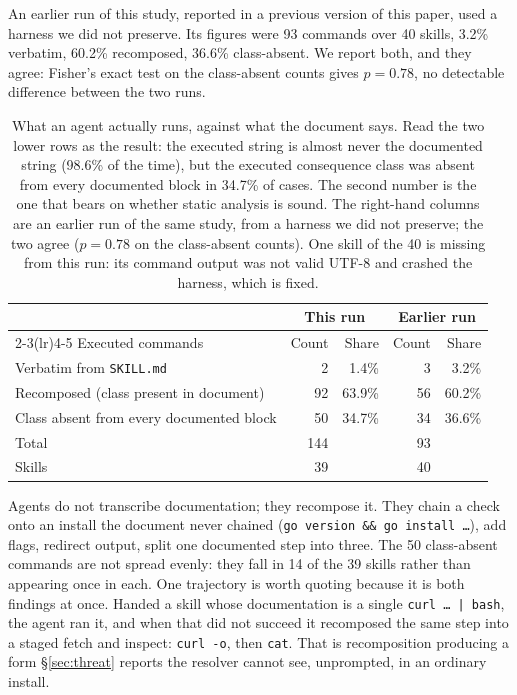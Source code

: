 \documentclass[10pt]{article}
\begin{document}
An earlier run of this study, reported in a previous version of this paper, used a
harness we did not preserve. Its figures were 93 commands over 40 skills, 3.2\%
verbatim, 60.2\% recomposed, 36.6\% class-absent. We report both, and they agree:
Fisher's exact test on the class-absent counts gives $p = 0.78$, no detectable
difference between the two runs.

\begin{table}[H]
\centering
\begin{tabular}{lrrrr}
\toprule
& \multicolumn{2}{c}{This run} & \multicolumn{2}{c}{Earlier run} \\
\cmidrule(lr){2-3}\cmidrule(lr){4-5}
Executed commands & Count & Share & Count & Share \\
\midrule
Verbatim from \texttt{SKILL.md} & 2 & 1.4\% & 3 & 3.2\% \\
Recomposed (class present in document) & 92 & 63.9\% & 56 & 60.2\% \\
Class absent from every documented block & 50 & 34.7\% & 34 & 36.6\% \\
\midrule
Total & 144 & & 93 & \\
Skills & 39 & & 40 & \\
\bottomrule
\end{tabular}
\caption{What an agent actually runs, against what the document says. Read the two
lower rows as the result: the executed string is almost never the documented string
(98.6\% of the time), but the executed consequence class was absent from every
documented block in 34.7\% of cases. The second number is the one that bears on
whether static analysis is sound. The right-hand columns are an earlier run of the
same study, from a harness we did not preserve; the two agree ($p = 0.78$ on the
class-absent counts). One skill of the 40 is missing from this run: its command
output was not valid UTF-8 and crashed the harness, which is fixed.}
\label{tab:divergence}
\end{table}

Agents do not transcribe documentation; they recompose it. They chain a check onto
an install the document never chained (\texttt{go version \&\& go install \ldots}),
add flags, redirect output, split one documented step into three. The 50
class-absent commands are not spread evenly: they fall in 14 of the 39 skills rather
than appearing once in each. One trajectory is worth quoting because it is both
findings at once. Handed a skill whose documentation is a single
\texttt{curl \ldots{} | bash}, the agent ran it, and when that did not succeed it
recomposed the same step into a staged fetch and inspect: \texttt{curl -o}, then
\texttt{cat}. That is recomposition producing a form \S\ref{sec:threat} reports the
resolver cannot see, unprompted, in an ordinary install.
\end{document}
